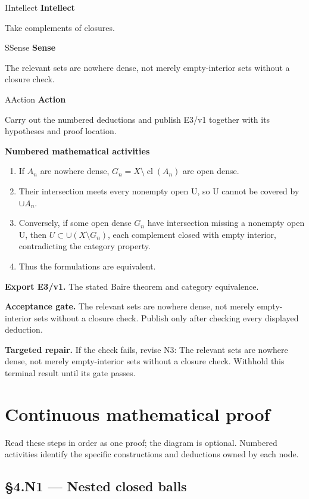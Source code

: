 \documentclass[preprint,12pt,aps,pra,showkeys,amsmath,amssymb,superscriptaddress,floatfix]{revtex4-2}
\theoremstyle{definition}
\theoremstyle{remark}
\newcommand{\mmfaculty}[3]{%
 \begin{mmfacultybox}{#1}{#2}
 {\sffamily\bfseries\color{MMBlue}#2}\par\smallskip #3
 \end{mmfacultybox}}
\newcommand{\field}[2]{\par\smallskip\noindent\textbf{#1.} #2\par}
\begin{document}
\mmfaculty{I}{Intellect}{Take complements of closures.}

\mmfaculty{S}{Sense}{The relevant sets are nowhere dense, not merely empty-interior sets
without a closure check.}

\mmfaculty{A}{Action}{Carry out the numbered deductions and publish E3/v1 together with its
hypotheses and proof location.}

\smallskip\noindent\textbf{Numbered mathematical activities}

\begin{enumerate}[label=N3.\arabic*,leftmargin=3.4em]

\item If \(A_n\) are nowhere dense, \(G_n=X\setminus\operatorname{cl}(A_n)\)
are open dense.

\item Their intersection meets every nonempty open U, so U cannot be covered
by \(\cup A_n\).

\item Conversely, if some open dense \(G_n\) have intersection missing a
nonempty open U, then \(U\subset \cup (X\setminus G_n)\), each
complement closed with empty interior, contradicting the category
property.

\item Thus the formulations are equivalent.

\end{enumerate}

\field{Export E3/v1}{The stated Baire theorem and category equivalence.}

\field{Acceptance gate}{The relevant sets are nowhere dense, not merely empty-interior sets
without a closure check. Publish only after checking every displayed
deduction.}

\field{Targeted repair}{If the check fails, revise N3: The relevant sets are nowhere dense, not
merely empty-interior sets without a closure check. Withhold this
terminal result until its gate passes.}

\endgroup\clearpage\section{Continuous mathematical proof}\label{sec:proof}

Read these steps in order as one proof; the diagram is optional.
Numbered activities identify the specific constructions and deductions
owned by each node.

\subsection{§4.N1 --- Nested closed balls}\label{n1-nested-closed-balls}
\end{document}
